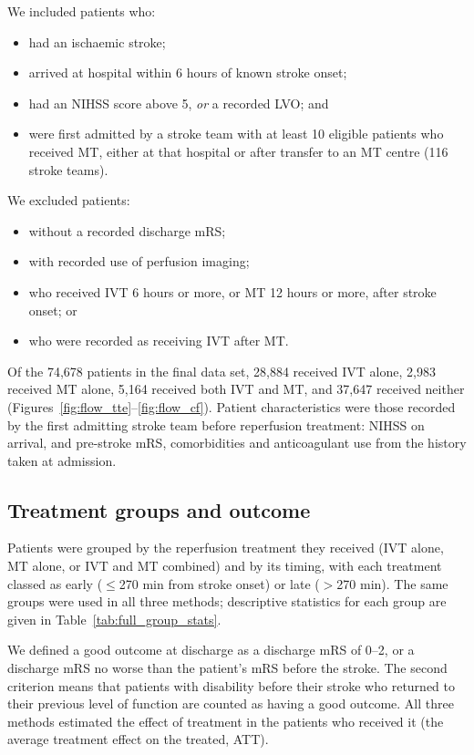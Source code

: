 We included patients who:
\begin{itemize}
    \item had an ischaemic stroke;
    \item arrived at hospital within 6 hours of known stroke onset;
    \item had an NIHSS score above 5, \textit{or} a recorded LVO; and
    \item were first admitted by a stroke team with at least 10 eligible patients who received MT, either at that hospital or after transfer to an MT centre (116 stroke teams).
\end{itemize}
We excluded patients:
\begin{itemize}
    \item without a recorded discharge mRS;
    \item with recorded use of perfusion imaging;
    \item who received IVT 6 hours or more, or MT 12 hours or more, after stroke onset; or
    \item who were recorded as receiving IVT after MT.
\end{itemize}
Of the 74,678 patients in the final data set, 28,884 received IVT alone, 2,983 received MT alone, 5,164 received both IVT and MT, and 37,647 received neither (Figures~\ref{fig:flow_tte}--\ref{fig:flow_cf}). Patient characteristics were those recorded by the first admitting stroke team before reperfusion treatment: NIHSS on arrival, and pre-stroke mRS, comorbidities and anticoagulant use from the history taken at admission. 

\subsection{Treatment groups and outcome}\label{sec:supp_groups_outcome}

Patients were grouped by the reperfusion treatment they received (IVT alone, MT alone, or IVT and MT combined) and by its timing, with each treatment classed as early ($\leq$270 min from stroke onset) or late ($>$270 min). The same groups were used in all three methods; descriptive statistics for each group are given in Table~\ref{tab:full_group_stats}.

We defined a good outcome at discharge as a discharge mRS of 0--2, or a discharge mRS no worse than the patient's mRS before the stroke. The second criterion means that patients with disability before their stroke who returned to their previous level of function are counted as having a good outcome. All three methods estimated the effect of treatment in the patients who received it (the average treatment effect on the treated, ATT).

